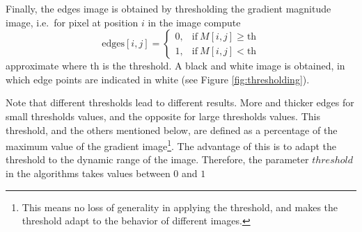 \documentclass{ipol}
\numberwithin{equation}{section}
\numberwithin{table}{section}
\begin{document}
Finally, the edges image is obtained by thresholding the gradient magnitude image, i.e.\ for pixel at position $i$ in the image compute
\begin{equation*}
	\mbox{edges}[i,j] = \begin{cases} 0,& \mbox{if}\ M[i,j]\geq\mbox{th} \\
									1,& \mbox{if}\ M[i,j]<\mbox{th}
					  \end{cases}
\end{equation*}approximate
where $\mbox{th}$ is the threshold. A black and white image is obtained, in which edge points are indicated in white (see Figure \ref{fig:thresholding}). 

Note that different thresholds lead to different results. More and thicker edges for small thresholds values, and the opposite for large thresholds values. This threshold, and the others mentioned below, are defined as a percentage of the maximum value 
of the gradient image\footnote{This means no loss of generality in applying the threshold, and makes the threshold adapt to the behavior of different images.}. The advantage of this is to adapt the threshold to the dynamic range of the image. 
Therefore, the parameter $threshold$ in the algorithms takes values ​​between $0$ and $1$

\clearpage
\end{document}
